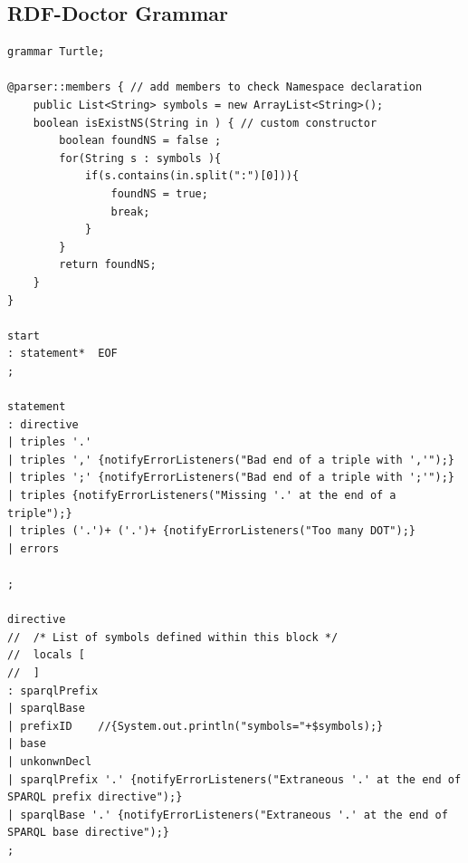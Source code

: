 \begin{appendices}


\chapter{RDF-Doctor Grammar}
\label{ch:appendix}

\lstset{
    basicstyle=\color{blue},%
    breaklines=true,%
    moredelim=[s][\color{green!50!black}\ttfamily]{'}{'},%
    moredelim=*[s][\color{black}\ttfamily]{options}{\}},%
    commentstyle={\color{gray}\itshape},%
    morecomment=[l]{//},%
    emph={%
        STRING%
        },emphstyle={\color{blue}\ttfamily},%
    alsoletter={:,|,;},%
    morekeywords={:,|,;},%
    keywordstyle={\color{black}},%
}

\begin{lstlisting}
grammar Turtle;

@parser::members { // add members to check Namespace declaration
	public List<String> symbols = new ArrayList<String>();
	boolean isExistNS(String in ) { // custom constructor
		boolean foundNS = false ; 
		for(String s : symbols ){
			if(s.contains(in.split(":")[0])){
				foundNS = true; 
				break;
			}
		}
		return foundNS;
	}
}

start
: statement*  EOF
;

statement
: directive
| triples '.'
| triples ',' {notifyErrorListeners("Bad end of a triple with ','");}
| triples ';' {notifyErrorListeners("Bad end of a triple with ';'");}
| triples {notifyErrorListeners("Missing '.' at the end of a triple");}
| triples ('.')+ ('.')+ {notifyErrorListeners("Too many DOT");}
| errors		

;

directive
//	/* List of symbols defined within this block */
//	locals [
//	]
: sparqlPrefix
| sparqlBase 
| prefixID    //{System.out.println("symbols="+$symbols);}
| base
| unkonwnDecl
| sparqlPrefix '.' {notifyErrorListeners("Extraneous '.' at the end of SPARQL prefix directive");}
| sparqlBase '.' {notifyErrorListeners("Extraneous '.' at the end of SPARQL base directive");}
;


\end{lstlisting}
\end{appendices}
